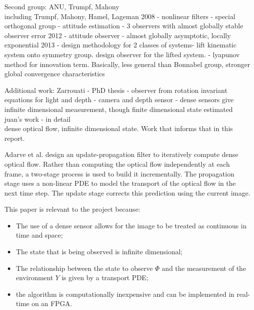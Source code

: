 Second group: ANU, Trumpf, Mahony\\
including Trumpf, Mahony, Hamel, Lageman
2008 \cite{mahony2009nonlinear} - nonlinear filters - special orthogonal group - attitude estimation - 3 observers with almost globally stable observer error
2012 \cite{trumpf2012analysis} - attitude observer - almost globally asymptotic, locally exponential
2013 \cite{mahony2013observers} - design methodology for 2 classes of systems- lift kinematic system onto symmetry group. design observer for the lifted system. - lyapunov method for innovation term. Basically, less general than Bonnabel group, stronger global convergence characteristics

Additional work:
Zarrouati \cite{zarrouati2013augmented} - PhD thesis - observer from rotation invariant equations for light and depth - camera and depth sensor - dense sensors give infinite dimensional measurement, though finite dimensional state estimated\\

juan's work \cite{adarvefiltering} - in detail\\
dense optical flow, infinite dimensional state. Work that informs that in this report.

Adarve et al. design an update-propagation filter to iteratively compute dense optical flow. Rather than computing the optical flow independently at each frame, a two-stage process is used to build it incrementally. The propagation stage uses a non-linear PDE to model the transport of the optical flow in the next time step. The update stage corrects this prediction using the current image.

This paper is relevant to the project because:
\begin{itemize}
\item The use of a dense sensor allows for the image to be treated as continuous in time and space;
\item The state that is being observed is infinite dimensional;
\item The relationship between the state to observe $ \Phi $ and the measurement of the environment $ Y $ is given by a transport PDE;
\item the algorithm is computationally inexpensive and can be implemented in real-time on an FPGA.
\end{itemize}

